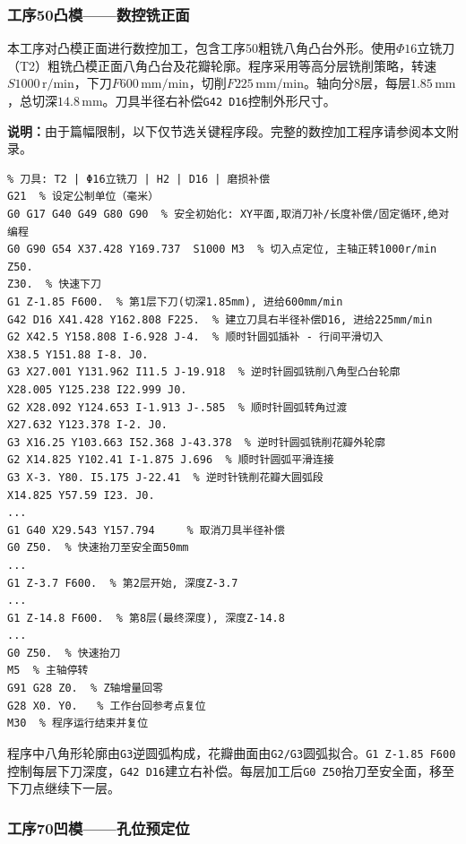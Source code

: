 \documentclass{xautCADreport}
\begin{document}
\subsubsection{工序50凸模——数控铣正面}

本工序对凸模正面进行数控加工，包含工序50粗铣八角凸台外形。使用$\Phi16$立铣刀（T2）粗铣凸模正面八角凸台及花瓣轮廓。程序采用等高分层铣削策略，转速$S1000\,\mathrm{r/min}$，下刀$F600\,\mathrm{mm/min}$，切削$F225\,\mathrm{mm/min}$。轴向分8层，每层$1.85\,\mathrm{mm}$，总切深$14.8\,\mathrm{mm}$。刀具半径右补偿\texttt{G42 D16}控制外形尺寸。

\noindent\textbf{说明：}由于篇幅限制，以下仅节选关键程序段。完整的数控加工程序请参阅本文附录。

\begin{lstlisting}[caption={工序50凸模粗铣正面程序（节选）}]
% 程序名: 工序50-凸模 (粗铣正面八角外形)
% 刀具: T2 | Φ16立铣刀 | H2 | D16 | 磨损补偿
G21  % 设定公制单位（毫米）
G0 G17 G40 G49 G80 G90  % 安全初始化: XY平面,取消刀补/长度补偿/固定循环,绝对编程
G0 G90 G54 X37.428 Y169.737  S1000 M3  % 切入点定位, 主轴正转1000r/min
Z50.  
Z30.  % 快速下刀
G1 Z-1.85 F600.  % 第1层下刀(切深1.85mm), 进给600mm/min
G42 D16 X41.428 Y162.808 F225.  % 建立刀具右半径补偿D16, 进给225mm/min
G2 X42.5 Y158.808 I-6.928 J-4.  % 顺时针圆弧插补 - 行间平滑切入
X38.5 Y151.88 I-8. J0.
G3 X27.001 Y131.962 I11.5 J-19.918  % 逆时针圆弧铣削八角型凸台轮廓
X28.005 Y125.238 I22.999 J0.
G2 X28.092 Y124.653 I-1.913 J-.585  % 顺时针圆弧转角过渡
X27.632 Y123.378 I-2. J0.
G3 X16.25 Y103.663 I52.368 J-43.378  % 逆时针圆弧铣削花瓣外轮廓
G2 X14.825 Y102.41 I-1.875 J.696  % 顺时针圆弧平滑连接
G3 X-3. Y80. I5.175 J-22.41  % 逆时针铣削花瓣大圆弧段
X14.825 Y57.59 I23. J0.
...
G1 G40 X29.543 Y157.794     % 取消刀具半径补偿
G0 Z50.  % 快速抬刀至安全面50mm
...
G1 Z-3.7 F600.  % 第2层开始, 深度Z-3.7
...
G1 Z-14.8 F600.  % 第8层(最终深度), 深度Z-14.8
...
G0 Z50.  % 快速抬刀
M5  % 主轴停转
G91 G28 Z0.  % Z轴增量回零
G28 X0. Y0.   % 工作台回参考点复位
M30  % 程序运行结束并复位
\end{lstlisting}

程序中八角形轮廓由\texttt{G3}逆圆弧构成，花瓣曲面由\texttt{G2/G3}圆弧拟合。\texttt{G1 Z-1.85 F600}控制每层下刀深度，\texttt{G42 D16}建立右补偿。每层加工后\texttt{G0 Z50}抬刀至安全面，移至下刀点继续下一层。

\subsubsection{工序70凹模——孔位预定位}
\end{document}
